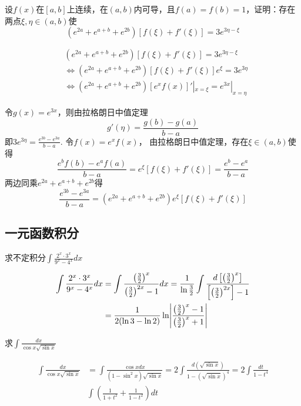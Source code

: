 \documentclass{article}
\begin{document}
\begin{examplle}[]
设\(f(x)\)在\([a,b]\)上连续，在\((a,b)\)内可导，且\(f(a)=f(b)=1\)，证明：存在
两点\(\xi,\eta\in(a,b)\)使
\begin{equation*}
(e^{2a}+e^{a+b}+e^{2b})[f(\xi)+f'(\xi)]=3e^{3\eta-\xi}
\end{equation*}


\begin{align*}
&(e^{2a}+e^{a+b}+e^{2b})[f(\xi)+f'(\xi)]=3e^{3\eta-\xi}\\
&\Leftrightarrow (e^{2a}+e^{a+b}+e^{2b})[f(\xi)+f'(\xi)]e^{\xi}=3e^{3\eta}\\
&\Leftrightarrow(e^{2a}+e^{a+b}+e^{2b})[e^xf(x)]'|_{x=\xi}=
e^{3x}|_{x=\eta}
\end{align*}

令\(g(x)=e^{3x}\)，则由拉格朗日中值定理
\begin{equation*}
g'(\eta)=\frac{g(b)-g(a)}{b-a}
\end{equation*}
即\(\displaystyle  3e^{3\eta}=\frac{e^{3b}-e^{3a}}{b-a}\). 令\(f(x)=e^xf(x)\)，
由拉格朗日中值定理，存在\(\xi\in(a,b)\)使得
\begin{equation*}
\frac{e^bf(b)-e^af(a)}{b-a}=e^{\xi}[f(\xi)+f'(\xi)]=\frac{e^b-e^a}{b-a}
\end{equation*}
两边同乘\(e^{2a}+e^{a+b}+e^{2b}\)得
\begin{equation*}
\frac{e^{3b}-e^{3a}}{b-a}=(e^{2a}+e^{a+b}+e^{2b})e^{\xi}[f(\xi)+f'(\xi)]
\end{equation*}
\end{examplle}
\subsection{一元函数积分}
\label{sec:org8e2d598}
\begin{examplle}[]
求不定积分\(\displaystyle\int\frac{2^x\cdot 3^x}{9^x-4^x}dx\)

\begin{align*}
\int\frac{2^x\cdot 3^x}{9^x-4^x}dx&=
\int\frac{\left(\frac{3}{2}\right)^x}{\left(\frac{3}{2}\right)^{2x}-1}dx=
\frac{1}{\ln\frac{3}{2}}\int\frac{d\left[\left(\frac{3}{2}\right)^x\right]}
{\left[\left(\frac{3}{2}\right)^{2x}\right]-1}\\
&=\frac{1}{2(\ln3-\ln2)}\ln\abs{\frac{\left(\frac{3}{2}\right)^x-1}
{\left(\frac{3}{2}\right)^x+1}}
\end{align*}
\end{examplle}

\begin{examplle}[]
求\(\displaystyle\int\frac{dx}{\cos x\sqrt{\sin x}}\)

\begin{align*}
\int\frac{dx}{\cos x\sqrt{\sin x}}&=
\int\frac{\cos xdx}{(1-\sin^2x)\sqrt{\sin x}}=
2\int\frac{d(\sqrt{\sin x})}{1-(\sqrt{\sin x})^4}=2\int\frac{dt}{1-t^4}\\
&\int\left(\frac{1}{1+t^2}+\frac{1}{1-t^2}\right)dt
\end{align*}
\end{examplle}
\end{document}
